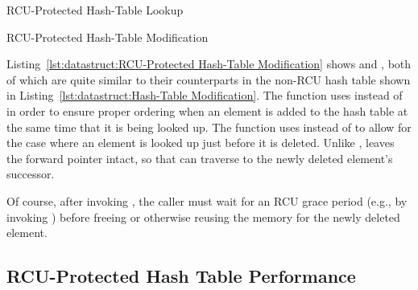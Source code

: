 \begin{listing}[tb]

\caption{RCU-Protected Hash-Table Lookup}
\label{lst:datastruct:RCU-Protected Hash-Table Lookup}
\end{listing}

\QuickQuizEnd

\begin{listing}[tb]

\caption{RCU-Protected Hash-Table Modification}
\label{lst:datastruct:RCU-Protected Hash-Table Modification}
\end{listing}

Listing~\ref{lst:datastruct:RCU-Protected Hash-Table Modification}
shows  and , both of which
are quite similar to their counterparts in the non-RCU hash table
shown in
Listing~\ref{lst:datastruct:Hash-Table Modification}.
The  function uses  instead
of  in order to ensure proper ordering when
an element is added to the hash table at the same time that it is
being looked up.
The  function uses  instead
of  to allow for the case where an element is
looked up just before it is deleted.
Unlike ,  leaves the
forward pointer intact, so that  can traverse
to the newly deleted element's successor.

Of course, after invoking , the caller must wait for
an RCU grace period (e.g., by invoking ) before
freeing or otherwise reusing the memory for the newly deleted element.

\subsection{RCU-Protected Hash Table Performance}
\label{sec:datastruct:RCU-Protected Hash Table Performance}

